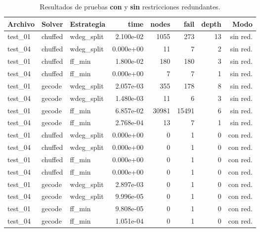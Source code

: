 \begin{compactfloats}
  \begin{table}[H]
    \centering
    \small
    \setlength{\tabcolsep}{10.8pt}
    \caption{Resultados de pruebas \textbf{con} y \textbf{sin} restricciones redundantes.}
    \label{tab:pruebas-reunion-redundancia}
    \begin{tabular}{l l l r r r r r}
      \toprule
      \textbf{Archivo} & \textbf{Solver} & \textbf{Estrategia} & \textbf{time} & \textbf{nodes} & \textbf{fail} & \textbf{depth} & \textbf{Modo} \\
      \midrule
      test\_01 & chuffed & wdeg\_split & 2.100e-02 & 1055 & 273 & 13 & sin red. \\
      test\_04 & chuffed & wdeg\_split & 0.000e+00 & 11 & 7 & 2 & sin red. \\
      test\_01 & chuffed & ff\_min & 1.800e-02 & 180 & 180 & 3 & sin red. \\
      test\_04 & chuffed & ff\_min & 0.000e+00 & 7 & 7 & 1 & sin red. \\
      \midrule
      test\_01 & gecode & wdeg\_split & 2.057e-03 & 355 & 178 & 8 & sin red. \\
      test\_04 & gecode & wdeg\_split & 1.480e-03 & 11 & 6 & 3 & sin red. \\
      test\_01 & gecode & ff\_min & 6.857e-02 & 30981 & 15491 & 6 & sin red. \\
      test\_04 & gecode & ff\_min & 2.768e-04 & 13 & 7 & 1 & sin red. \\
      \midrule
      test\_01 & chuffed & wdeg\_split & 0.000e+00 & 0 & 1 & 0 & con red. \\
      test\_04 & chuffed & wdeg\_split & 0.000e+00 & 0 & 1 & 0 & con red. \\
      test\_01 & chuffed & ff\_min & 0.000e+00 & 0 & 1 & 0 & con red. \\
      test\_04 & chuffed & ff\_min & 0.000e+00 & 0 & 1 & 0 & con red. \\
      \midrule
      test\_01 & gecode & wdeg\_split & 2.897e-03 & 0 & 1 & 0 & con red. \\
      test\_04 & gecode & wdeg\_split & 9.996e-05 & 0 & 1 & 0 & con red. \\
      test\_01 & gecode & ff\_min & 9.808e-05 & 0 & 1 & 0 & con red. \\
      test\_04 & gecode & ff\_min & 1.051e-04 & 0 & 1 & 0 & con red. \\
      \bottomrule
    \end{tabular}
  \end{table}
\end{compactfloats}

\FloatBarrier
